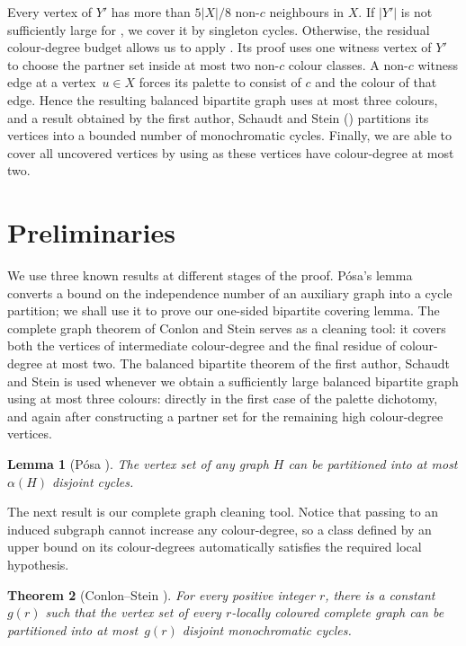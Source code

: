 \documentclass[a4paper,12pt,reqno]{amsart}
\newtheorem{theorem}{Theorem}[section]
\newtheorem{lemma}[theorem]{Lemma}
\begin{document}
Every vertex of $Y'$ has more than $5|X|/8$ non-$c$ neighbours in $X$. If $|Y'|$
is not sufficiently large for , we cover it by
singleton cycles. Otherwise, the residual colour-degree budget allows us to
apply . Its proof uses one witness vertex of $Y'$ to
choose the partner set inside at most two non-$c$ colour classes. A non-$c$
witness edge at a vertex~$u\in X$ forces its palette to consist of $c$ and the
colour of that edge. Hence the resulting balanced bipartite graph uses at most
three colours, and a result obtained by the first author, Schaudt and Stein
() partitions its vertices into a bounded
number of monochromatic cycles. Finally, we are able to cover all uncovered
vertices by using  as these vertices have colour-degree
at most two.


\section{Preliminaries}\label{sec:preliminaries}

We use three known results at different stages of the proof.  P\'osa's lemma
converts a bound on the independence number of an auxiliary graph into a cycle
partition; we shall use it to prove our one-sided bipartite covering lemma.  The
complete graph theorem of Conlon and Stein serves as a cleaning tool: it covers
both the vertices of intermediate colour-degree and the final residue of
colour-degree at most two.  The balanced bipartite theorem of the first author,
Schaudt and Stein is used whenever we obtain a sufficiently large balanced
bipartite graph using at most three colours: directly in the first case of the
palette dichotomy, and again after constructing a partner set for the remaining
high colour-degree vertices.

\begin{lemma}[P\'osa \cite{Posa1963}]\label{lem:posa}
  The vertex set of any graph $H$ can be partitioned into at most
  $\alpha(H)$ disjoint cycles.
\end{lemma}

The next result is our complete graph cleaning tool. Notice that passing to
an induced subgraph cannot increase any colour-degree, so a class defined by
an upper bound on its colour-degrees automatically satisfies the required local
hypothesis.

\begin{theorem}[Conlon--Stein \cite{ConlonStein2016}]
  \label{thm:local-complete}
  For every positive integer $r$, there is a constant $g(r)$ such that the
  vertex set of every $r$-locally coloured complete graph can be partitioned
  into at most~$g(r)$ disjoint monochromatic cycles.
\end{theorem}
\end{document}
